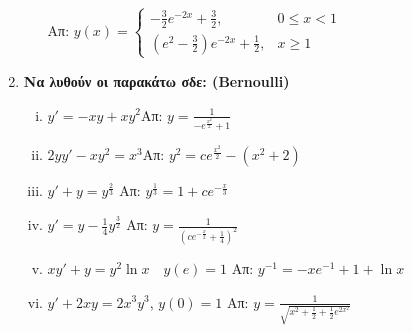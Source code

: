 \begin{enumerate}
\begin{enumerate}
        \hfill  Απ: $y(x)=
        \begin{cases}
          -\frac{3}{2}e^{-2x}+\frac{3}{2}, & 0\leq x<1 \\
          \left(e^2-\frac{3}{2}\right)e^{-2x}+\frac{1}{2}, &  x\geq 1
        \end{cases}$
    \end{enumerate}

  \item {\bfseries Να λυθούν οι παρακάτω σδε: (Bernoulli)}
    \begin{enumerate}[i)]
      \item $y'=-xy+xy^2$\hfill Απ: $y=\frac{1}{-e^{\frac{x^2}{2}}+1}$
      \item $2yy'-xy^2=x^3$\hfill Απ: $y^2=ce^{\frac{x^2}{2}}-(x^2+2)$
      \item $y'+y=y^{\frac{2}{3}}$ \hfill Απ: $y^{\frac{1}{3}}=1+ce^{-\frac{x}{3}}$
      \item $ y'=y- \frac{1}{4} y^{\frac{3}{2}} $ 
        \hfill Απ: $ y= \frac{1}{(ce^{- \frac{x}{2}}+ \frac{1}{4} )^{2}}  $ 
      \item $xy'+y=y^{2}\ln x \quad y(e)=1$ \hfill Απ: $y^{-1}=-xe^{-1}+1+\ln x$
      \item $ y'+2xy=2x^{3}y^{3} $, \quad $ y(0)=1 $ 
        \hfill Απ: $ y=\frac{1}{\sqrt{x^{2}+ \frac{1}{2}+\frac{1}{2} e^{2x^{2}}}} $ 
    \end{enumerate}




\end{enumerate}
